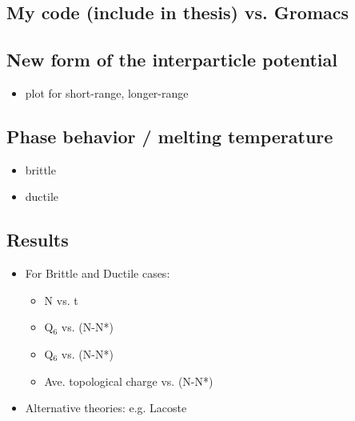 \documentclass{umthesis}
\begin{document}
\subsection{My code (include in thesis) vs. Gromacs}
\label{sec-2.3.2}
\subsection{New form of the interparticle potential}
\label{sec-2.3.3}
\begin{itemize}

\item plot for short-range, longer-range\\
\label{sec-2.3.3.1}%
\end{itemize} %
\subsection{Phase behavior / melting temperature}
\label{sec-2.3.4}
\begin{itemize}

\item brittle\\
\label{sec-2.3.4.1}%
\item ductile\\
\label{sec-2.3.4.2}%
\end{itemize} %
\subsection{Results}
\label{sec-2.3.5}
\begin{itemize}

\item For Brittle and Ductile cases:
\label{sec-2.3.5.1}%
\begin{itemize}

\item N vs. t\\
\label{sec-2.3.5.1.1}%
\item Q$_6$ vs. (N-N*)\\
\label{sec-2.3.5.1.2}%
\item Q$_6$ vs. (N-N*)\\
\label{sec-2.3.5.1.3}%
\item Ave. topological charge vs. (N-N*)\\
\label{sec-2.3.5.1.4}%
\end{itemize} %

\item Alternative theories: e.g. Lacoste\\
\label{sec-2.4.1}%
\end{itemize} %
\end{document}

